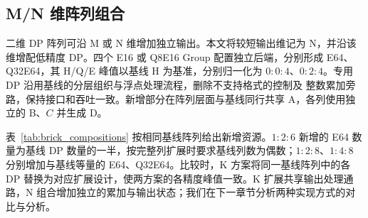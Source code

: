 \subsection{M/N 维阵列组合}
\label{sec:n_expansion}
\label{sec:brick_composition}

二维 DP 阵列可沿 M 或 N 维增加独立输出。本文将较短输出维记为 N，并沿该维增配低精度 DP。四个 E16 或 Q8E16 Group 配置独立后端，分别形成 E64、Q32E64，其 H/Q/E 峰值以基线 H 为基准，分别归一化为 $0:0:4$、$0:2:4$。专用 DP 沿用基线的分层组织与浮点处理流程，删除不支持格式的控制及 整数累加旁路，保持接口和吞吐一致。新增部分在阵列层面与基线同行共享 A，各列使用独立的 B、$C$ 并生成 D。

表~\ref{tab:brick_compositions} 按相同基线阵列给出新增资源。$1:2:6$ 新增的 E64 数量为基线 DP 数量的一半，按完整列扩展时要求基线列数为偶数；$1:2:8$、$1:4:8$ 分别增加与基线等量的 E64、Q32E64。比较时，K 方案将同一基线阵列中的各 DP 替换为对应扩展设计，使两方案的各精度峰值一致。K 扩展共享输出处理通路，N 组合增加独立的累加与输出状态；我们在下一章节分析两种实现方式的对比与分析。
